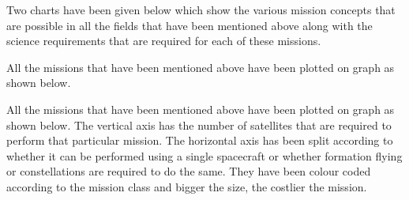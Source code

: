 \vspace{1cm}

Two charts have been given below which show the various mission concepts that are possible in all the fields that have been mentioned above along with the science requirements that are required for each of these missions. 
\newpage

\newpage

\vspace*{15cm} 
All the missions that have been mentioned above have been plotted on graph as shown below. 

All the missions that have been mentioned above have been plotted on graph as shown below. The vertical axis has the number of satellites that are required to perform that particular mission. The horizontal axis has been split according to whether it can be performed using a single spacecraft or whether formation flying or constellations are required to do the same. They have been colour coded according to the mission class and bigger the size, the costlier the mission. 

\newpage